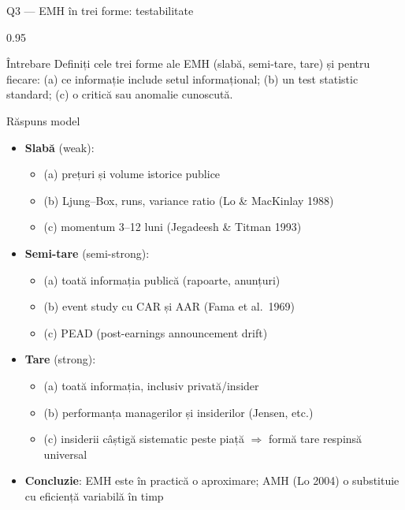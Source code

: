 \documentclass[9pt, aspectratio=169, t]{beamer}
\begin{document}
\begin{frame}[shrink=25]{Q3 --- EMH în trei forme: testabilitate}
\begin{cminipage}{0.95\textwidth}
\begin{block}{Întrebare}
Definiți cele trei forme ale EMH (slabă, semi-tare, tare) și pentru fiecare:
(a) ce informație include setul informațional;
(b) un test statistic standard;
(c) o critică sau anomalie cunoscută.
\end{block}
\begin{exampleblock}{Răspuns model}
\begin{itemize}\setlength{\itemsep}{0pt}
    \item \textbf{Slabă} (weak):
    \begin{itemize}\setlength{\itemsep}{0pt}
        \item (a) prețuri și volume istorice publice
        \item (b) Ljung--Box, runs, variance ratio (Lo \& MacKinlay 1988)
        \item (c) momentum 3--12 luni (Jegadeesh \& Titman 1993)
    \end{itemize}
    \item \textbf{Semi-tare} (semi-strong):
    \begin{itemize}\setlength{\itemsep}{0pt}
        \item (a) toată informația publică (rapoarte, anunțuri)
        \item (b) event study cu CAR și AAR (Fama et al.\ 1969)
        \item (c) PEAD (post-earnings announcement drift)
    \end{itemize}
    \item \textbf{Tare} (strong):
    \begin{itemize}\setlength{\itemsep}{0pt}
        \item (a) toată informația, inclusiv privată/insider
        \item (b) performanța managerilor și insiderilor (Jensen, etc.)
        \item (c) insiderii câștigă sistematic peste piață $\Rightarrow$ formă tare respinsă universal
    \end{itemize}
    \item \textbf{Concluzie}: EMH este în practică o aproximare; AMH (Lo 2004) o substituie cu eficiență variabilă în timp
\end{itemize}
\end{exampleblock}
\end{cminipage}
\end{frame}
\end{document}
